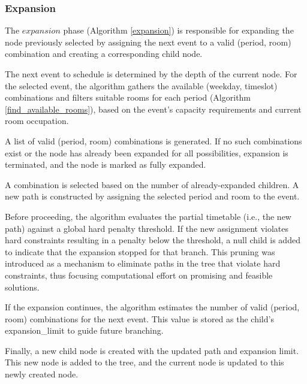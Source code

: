 \subsubsection{Expansion}

The \(expansion\) phase (Algorithm \ref{expansion}) is responsible for expanding the node previously selected by assigning the next event to a valid (period, room) combination and creating a corresponding child node.

The next event to schedule is determined by the depth of the current node. For the selected event, the algorithm gathers the available (weekday, timeslot) combinations and filters suitable rooms for each period (Algorithm \ref{find_available_rooms}), based on the event’s capacity requirements and current room occupation.

A list of valid (period, room) combinations is generated. If no such combinations exist or the node has already been expanded for all possibilities, expansion is terminated, and the node is marked as fully expanded.  

A combination is selected based on the number of already-expanded children. A new path is constructed by assigning the selected period and room to the event.

Before proceeding, the algorithm evaluates the partial timetable (i.e., the new path) against a global hard penalty threshold. If the new assignment violates hard constraints resulting in a penalty below the threshold, a null child is added to indicate that the expansion stopped for that branch. This pruning was introduced as a mechanism to eliminate paths in the tree that violate hard constraints, thus focusing computational effort on promising and feasible solutions.

If the expansion continues, the algorithm estimates the number of valid (period, room) combinations for the next event. This value is stored as the child’s expansion\_limit to guide future branching.

Finally, a new child node is created with the updated path and expansion limit. This new node is added to the tree, and the current node is updated to this newly created node.

